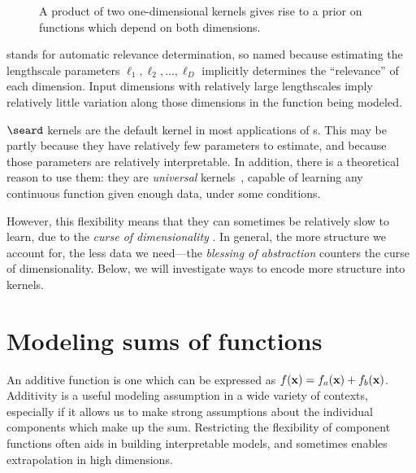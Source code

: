 \begin{figure}[ht!]
\begin{tabular}{ccccccc}
\end{tabular}
\caption[A product of squared-exponential kernels across different dimensions]{
A product of two one-dimensional kernels gives rise to a prior on functions which depend on both dimensions.
}
\label{fig:product-of-se-kernels}
\end{figure}

\ARD{} stands for automatic relevance determination, so named because estimating the lengthscale parameters $\ell_1, \ell_2, \dots, \ell_D$ implicitly determines the ``relevance'' of each dimension.
Input dimensions with relatively large lengthscales imply relatively little variation along those dimensions in the function being modeled.

$\seard$ kernels are the default kernel in most applications of \gp{}s.
This may be partly because they have relatively few parameters to estimate, and because those parameters are relatively interpretable.
In addition, there is a theoretical reason to use them: they are \emph{universal} kernels~\citep{micchelli2006universal}, capable of learning any continuous function given enough data, under some conditions.

However, this flexibility means that they can sometimes be relatively slow to learn, due to the \emph{curse of dimensionality} \citep{bellman1956dynamic}.
In general, the more structure we account for, the less data we need---the \emph{blessing of abstraction} \citep{goodman2011learning} counters the curse of dimensionality.
Below, we will investigate ways to encode more structure into kernels.



\section{Modeling sums of functions}
\label{sec:modeling-sums-of-functions}
An additive function is one which can be expressed as $f({\bf{x}}) = f_a({\bf{x}}) + f_b({\bf{x}})$.
Additivity is a useful modeling assumption in a wide variety of contexts, especially if it allows us to make strong assumptions about the individual components which make up the sum.
Restricting the flexibility of component functions often aids in building interpretable models, and sometimes enables extrapolation in high dimensions.

